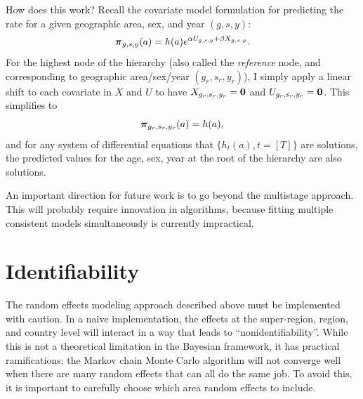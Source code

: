 How does this work?  Recall the covariate model formulation for
predicting the rate for a given geographic area, sex, and year $(g,s,y)$:
\[
{\boldsymbol{\pi}}_{g,s,y}(a) = h(a)e^{\alpha U_{g,s,y} + \beta X_{g,s,y}}. 
\]
For the highest node of the hierarchy (also called the
\emph{reference} node, and corresponding to geographic area/sex/year $(g_r, s_r,
y_r)$), I simply apply a linear shift to each covariate in $X$ and $U$
to have $X_{{g_r},{s_r},{y_r}} = \mathbf{0}$ and $U_{g_r,s_r,y_r} = \mathbf{0}$.  This
simplifies to \[ {\boldsymbol{\pi}}_{g_r,s_r,y_r}(a) = h(a), \] and for any system
of differential equations that $\{h_t(a), t=[T]\}$ are
solutions, the predicted values for the age, sex, year at the root of
the hierarchy are also solutions.

An important direction for future work is to go beyond the multistage
approach.  This will probably require innovation in algorithms,
because fitting multiple consistent models simultaneously is currently
impractical.

\section{Identifiability}
The random effects modeling approach described above must be
implemented with caution.  In a naive implementation, the effects at
the super-region, region, and country level will interact in a way
that leads to ``nonidentifiability''.  While this is not a
theoretical limitation in the Bayesian framework, it has practical
ramifications: the Markov chain Monte Carlo algorithm will not converge well when there
are many random effects that can all do the same job.  To avoid this,
it is important to carefully choose which area random effects to include.

